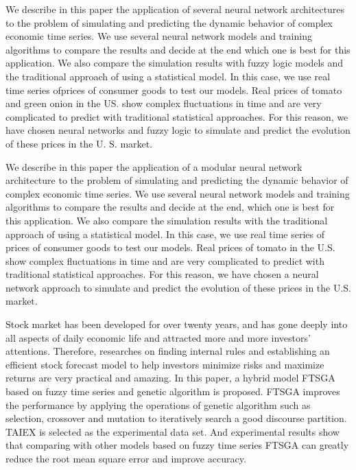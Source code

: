 \cite{Castillo2001} We describe in this paper the application of several neural
network architectures to the problem of simulating and predicting the dynamic
behavior of complex economic time series. We use several neural network models
and training algorithms to compare the results and decide at the end which one
is best for this application. We also compare the simulation results with fuzzy
logic models and the traditional approach of using a statistical model. In this
case, we use real time series ofprices of consumer goods to test our
models. Real prices of tomato and green onion in the US. show complex
fluctuations in time and are very complicated to predict with traditional
statistical approaches. For this reason, we have chosen neural networks and
fuzzy logic to simulate and predict the evolution of these prices in the
U. S. market.

\cite{melin2007hybrid} We describe in this paper the application of a modular
neural network architecture to the problem of simulating and predicting the
dynamic behavior of complex economic time series. We use several neural network
models and training algorithms to compare the results and decide at the end,
which one is best for this application. We also compare the simulation results
with the traditional approach of using a statistical model. In this case, we use
real time series of prices of consumer goods to test our models. Real prices of
tomato in the U.S. show complex fluctuations in time and are very complicated to
predict with traditional statistical approaches. For this reason, we have chosen
a neural network approach to simulate and predict the evolution of these prices
in the U.S. market.

\cite{Cai2013} Stock market has been developed for over twenty years, and has
gone deeply into all aspects of daily economic life and attracted more and more
investors’ attentions. Therefore, researches on finding internal rules and
establishing an efficient stock forecast model to help investors minimize risks
and maximize returns are very practical and amazing. In this paper, a hybrid
model FTSGA based on fuzzy time series and genetic algorithm is proposed. FTSGA
improves the performance by applying the operations of genetic algorithm such as
selection, crossover and mutation to iteratively search a good discourse
partition. TAIEX is selected as the experimental data set. And experimental
results show that comparing with other models based on fuzzy time series FTSGA
can greatly reduce the root mean square error and improve accuracy.

